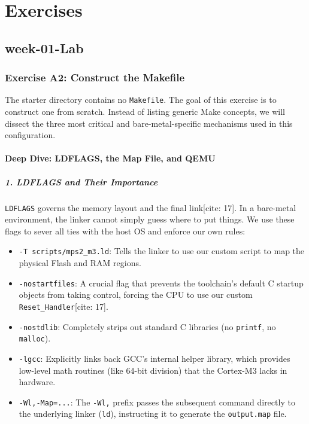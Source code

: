 \chapter{Exercises}

\section{week-01-Lab}

\subsection{Exercise A2: Construct the Makefile}
The starter directory contains no \texttt{Makefile}. The goal of this exercise is to construct one from scratch. Instead of listing generic Make concepts, we will dissect the three most critical and bare-metal-specific mechanisms used in this configuration.

\subsubsection{Deep Dive: LDFLAGS, the Map File, and QEMU}

\paragraph{1. LDFLAGS and Their Importance}
\texttt{LDFLAGS} governs the memory layout and the final link[cite: 17]. In a bare-metal environment, the linker cannot simply guess where to put things. We use these flags to sever all ties with the host OS and enforce our own rules:
\begin{itemize}
    \item \texttt{-T scripts/mps2\_m3.ld}: Tells the linker to use our custom script to map the physical Flash and RAM regions.
    \item \texttt{-nostartfiles}: A crucial flag that prevents the toolchain's default C startup objects from taking control, forcing the CPU to use our custom \texttt{Reset\_Handler}[cite: 17].
    \item \texttt{-nostdlib}: Completely strips out standard C libraries (no \texttt{printf}, no \texttt{malloc}).
    \item \texttt{-lgcc}: Explicitly links back GCC's internal helper library, which provides low-level math routines (like 64-bit division) that the Cortex-M3 lacks in hardware.
    \item \texttt{-Wl,-Map=...}: The \texttt{-Wl,} prefix passes the subsequent command directly to the underlying linker (\texttt{ld}), instructing it to generate the \texttt{output.map} file.
\end{itemize}

